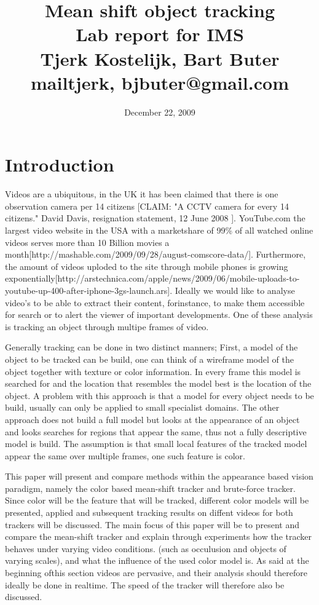 \documentclass[a4paper,11pt]{article}
\title{Mean shift object tracking\\ Lab report for IMS\\ Tjerk Kostelijk, Bart Buter\\{mailtjerk, bjbuter}@gmail.com}
\date{December 22, 2009}
\begin{document}
\maketitle
\section{Introduction}
	Videos are a ubiquitous, in the UK it has been claimed that there is one observation camera per 14 citizens [CLAIM: "A CCTV camera for every 14 citizens."
	David Davis, resignation statement, 12 June 2008 ]. YouTube.com the largest video website in the USA with a marketshare of 99\% of all watched online videos serves more than 10 Billion movies a month[http://mashable.com/2009/09/28/august-comscore-data/]. 
	Furthermore, the amount of videos uploded to the site through mobile phones is growing exponentially[http://arstechnica.com/apple/news/2009/06/mobile-uploads-to-youtube-up-400-after-iphone-3gs-launch.ars].
	Ideally we would like to analyse video's to be able to extract their content, forinstance, to make them accessible for search or to alert the viewer of important developments. One of these analysis is tracking an object through multipe frames of video.

	Generally tracking can be done in two distinct manners; First, a model of the object to be tracked can be build, one can think of a wireframe model of the object together with texture or color information. 
	In every frame this model is searched for and the location that resembles the model best is the location of the object. A problem with this approach is that a model for every object needs to be build, usually can only be applied to small specialist domains. 
	The other approach does not build a full model but looks at the appearance of an object and looks searches for regions that appear the same, thus not a fully descriptive model is build. 
	The assumption is that small local features of the tracked model appear the same over multiple frames, one such feature is color.

	This paper will present and compare methods within the appearance based vision paradigm, namely the color based mean-shift tracker and brute-force tracker. 
	Since color will be the feature that will be tracked, different color models will be presented, applied and subsequent tracking results on diffent videos for both trackers will be discussed.
	The main focus of this paper will be to present and compare the mean-shift tracker and explain through experiments how the tracker behaves under varying video conditions. (such as occulusion and objects of varying scales), and what the influence of the used color model is.
	As said at the beginning ofthis section videos are pervasive, and their analysis should therefore ideally be done in realtime. The speed of the tracker will therefore also be discussed.
\end{document}
